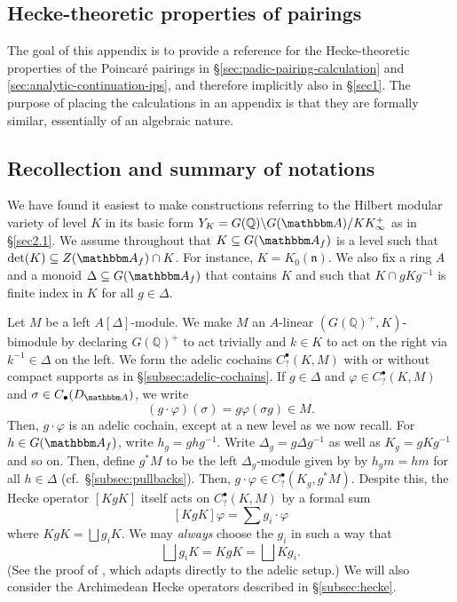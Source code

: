 \documentclass[10pt, twoside]{amsart}
\theoremstyle{plain}
\theoremstyle{definition}
\theoremstyle{remark}
\numberwithin{equation}{subsection}
\def\Q{\mathbb Q}
\def\A{\mathbbm A}
\def\gn{\mathfrak n}
\begin{document}
\begin{appendix}

\section{Hecke-theoretic properties of pairings}\label{app:hecke}

The goal of this appendix is to provide a reference for the Hecke-theoretic properties of the Poincar\'e pairings in \S \ref{sec:padic-pairing-calculation} and \ref{sec:analytic-continuation-ips}, and therefore implicitly also in \S \ref{sec1}. The purpose of placing the calculations in an appendix is that they are formally similar, essentially of an algebraic nature.

\subsection{Recollection and summary of notations}

We have found it easiest to make constructions referring to the Hilbert modular variety of level $K$ in its basic form
$Y_K = G(\Q)\backslash G(\A) / K K_\infty^+$ as in \S \ref{sec2.1}. We assume throughout that $K \subseteq G(\A_f)$ { is} a level such that $\det(K) \subseteq Z(\A_f) \cap K$.  For instance, $K = K_0(\gn)$. We also fix a ring $A$ and a monoid $\Delta \subseteq G(\A_f)$ that contains $K$ and such that $K \cap gKg^{-1}$ is finite index in $K$ for all $g \in \Delta$. 

Let $M$ be a left $A[\Delta]$-module. We make $M$ an $A$-linear $(G(\Q)^+,K)$-bimodule by declaring $G(\Q)^+$ to act trivially and $k \in K$ to act on the right via $k^{-1} \in \Delta$ on the left. We form the adelic cochains $C^{\bullet}_{?}(K,M)$ with or without compact supports as in \S \ref{subsec:adelic-cochains}. If $g \in \Delta$ and $\varphi \in C^{\bullet}_{?}(K,M)$ and $\sigma \in C_{\bullet}(D_{\A})$, we write
$$
(g\cdot \varphi)(\sigma) = g\varphi(\sigma g) \in M.
$$
Then, $g\cdot \varphi$ is an adelic cochain, except at a new level as we now recall. For $h \in G(\A_f)$, write $h_g = ghg^{-1}$. Write $\Delta_g = g\Delta g^{-1}$ as well as $K_g = gKg^{-1}$ and so on. Then, define $g^{\ast}M$ to be the left $\Delta_g$-module given by by $h_g m = hm$ for all $h \in \Delta$  (cf.\ \S \ref{subsec:pullbacks}). Then, $g\cdot \varphi\in C^{\bullet}_{?}(K_g,g^{\ast}M)$. Despite this, the Hecke operator $[KgK]$ itself acts on $C^{\bullet}_{?}(K,M)$ by a formal sum
$$
[KgK]\varphi = \sum g_i \cdot \varphi
$$
where $KgK = \bigsqcup g_i K$. We may {\em always} choose the $g_i$ in such a way that 
\begin{equation}\label{eqn:coset-left-right}
\bigsqcup g_i K = KgK = \bigsqcup Kg_i.
\end{equation}
(See the proof of \cite[Lemma 5.5.1]{DiamondShurman-ModularForms}, which adapts directly to the adelic setup.) We will also consider the Archimedean Hecke operators described in \S \ref{subsec:hecke}.


\end{appendix}
\end{document}
